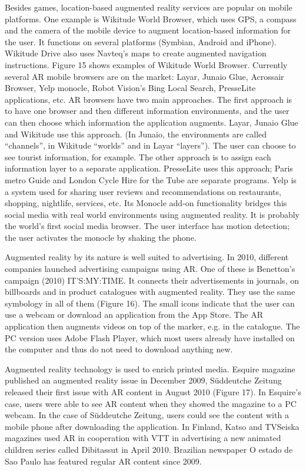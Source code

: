 Besides games, location-based augmented reality services are popular on mobile platforms. One example is Wikitude World Browser, which uses GPS, a compass and the camera of the mobile device to augment location-based information for the user. It functions on several platforms (Symbian, Android and iPhone). Wikitude Drive also uses Navteq’s maps to create augmented navigation instructions. Figure 15 shows examples of Wikitude World Browser. Currently several AR mobile browsers are on the market: Layar, Junaio Glue, Acrossair Browser, Yelp monocle, Robot Vision’s Bing Local Search, PresseLite applications, etc. AR browsers have two main approaches. The first approach is to have one browser and then different information environments, and the user can then choose which information the application augments. Layar, Junaio Glue and Wikitude use this approach. (In Junaio, the environments are called “channels”, in Wikitude “worlds” and in Layar “layers”). The user can choose to see tourist information, for example. The other approach is to assign each information layer to a separate application. PresseLite uses this approach; Paris metro Guide and London Cycle Hire for the Tube are separate programs. Yelp is a system used for sharing user reviews and recommendations on restaurants, shopping, nightlife, services, etc. Its Monocle add-on functionality bridges this social media with real world environments using augmented reality. It is probably the world’s first social media browser. The user interface has motion detection; the user activates the monocle by shaking the phone.

Augmented reality by its nature is well suited to advertising. In 2010, different
companies launched advertising campaigns using AR. One of these is Benetton’s
campaign (2010) IT’S:MY:TIME. It connects their advertisements in journals, on
billboards and in product catalogues with augmented reality. They use the same
symbology in all of them (Figure 16). The small icons indicate that the user can
use a webcam or download an application from the App Store. The AR application
then augments videos on top of the marker, e.g. in the catalogue. The PC version
uses Adobe Flash Player, which most users already have installed on the computer
and thus do not need to download anything new.

Augmented reality technology is used to enrich printed media. Esquire magazine published an augmented reality issue in December 2009, Süddeutche Zeitung released their first issue with AR content in August 2010 (Figure 17). In Esquire’s case, users were able to see AR content when they showed the magazine to a PC webcam. In the case of Süddeutche Zeitung, users could see the content with a mobile phone after downloading the application. In Finland, Katso and TVSeiska magazines used AR in cooperation with VTT in advertising a new animated children series called Dibitassut in April 2010. Brazilian newspaper O estado de Sao Paulo has featured regular AR content since 2009.

